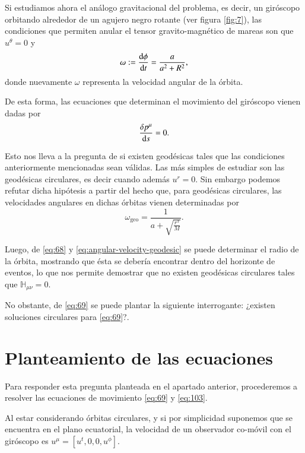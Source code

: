 Si estudiamos ahora el análogo gravitacional del problema, es decir, un giróscopo orbitando alrededor de un agujero negro rotante (ver figura \ref{fig:7}), las condiciones que permiten anular el tensor gravito-magnético de mareas son que $u^{\theta}=0$ y 
\begin{equation}
\label{eq:68}
\omega := \dv{\phi}{t} = \frac{a}{a^2 + R^2},
\end{equation}
donde nuevamente $\omega$ representa la velocidad angular de la órbita.

De esta forma, las ecuaciones que determinan el movimiento del giróscopo vienen dadas por 
\begin{equation}
\label{eq:69}
\frac{\delta p^{\mu}}{\mathrm{d}s} = 0.
\end{equation}

Esto nos lleva a la pregunta de si existen geodésicas tales que las condiciones anteriormente mencionadas sean válidas. Las más simples de estudiar son las geodésicas circulares, es decir cuando además $u^r=0$. Sin embargo podemos refutar dicha hipótesis a partir del hecho que, para geodésicas circulares, las velocidades angulares en dichas órbitas vienen determinadas por \cite{Matolcsi} 
\begin{equation}
\label{eq:angular-velocity-geodesic}
\omega_{\mathrm{geo}} = \frac{1}{a + \sqrt{\frac{r^3}{M}}}.
\end{equation}

Luego, de \eqref{eq:68} y \eqref{eq:angular-velocity-geodesic} se puede determinar el radio de la órbita, mostrando que ésta se debería encontrar dentro del horizonte de eventos, lo que nos permite demostrar que no existen geodésicas circulares tales que $\mathbb{H}_{\mu \nu}=0$. 

No obstante, de \eqref{eq:69} se puede plantar la siguiente interrogante: ¿existen soluciones circulares para \eqref{eq:69}?.

\section{Planteamiento de las ecuaciones}

Para responder esta pregunta planteada en el apartado anterior, procederemos a resolver las ecuaciones de movimiento \eqref{eq:69} y \eqref{eq:103}. 

Al estar considerando órbitas circulares, y si por simplicidad suponemos que se encuentra en el plano ecuatorial, la velocidad de un observador co-móvil con el giróscopo es $u^{\mu} = \left[ u^t,0,0,u^{\phi} \right]$.


